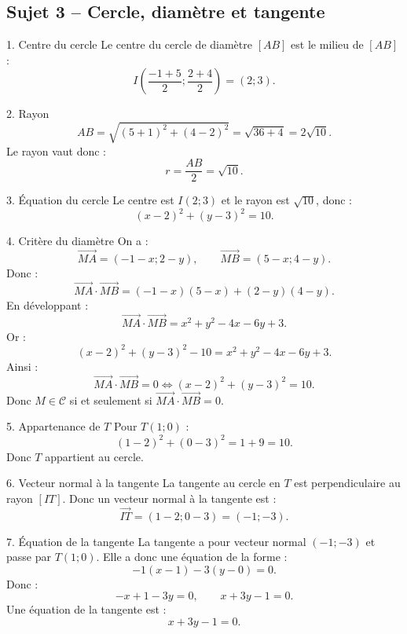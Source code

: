 \documentclass[11pt,a4paper]{article}
\begin{document}
\subsection*{Sujet 3 -- Cercle, diamètre et tangente}
\begin{correctionbox}{1. Centre du cercle}
Le centre du cercle de diamètre $[AB]$ est le milieu de $[AB]$ :
\[
I\left(\frac{-1+5}{2};\frac{2+4}{2}\right)=(2;3).
\]
\end{correctionbox}
\begin{correctionbox}{2. Rayon}
\[
AB=\sqrt{(5+1)^2+(4-2)^2}=\sqrt{36+4}=2\sqrt{10}.
\]
Le rayon vaut donc :
\[
r=\frac{AB}{2}=\sqrt{10}.
\]
\end{correctionbox}
\begin{correctionbox}{3. Équation du cercle}
Le centre est $I(2;3)$ et le rayon est $\sqrt{10}$, donc :
\[
(x-2)^2+(y-3)^2=10.
\]
\end{correctionbox}
\begin{correctionbox}{4. Critère du diamètre}
On a :
\[
\overrightarrow{MA}=(-1-x;2-y),\qquad
\overrightarrow{MB}=(5-x;4-y).
\]
Donc :
\[
\overrightarrow{MA}\cdot\overrightarrow{MB}=(-1-x)(5-x)+(2-y)(4-y).
\]
En développant :
\[
\overrightarrow{MA}\cdot\overrightarrow{MB}=x^2+y^2-4x-6y+3.
\]
Or :
\[
(x-2)^2+(y-3)^2-10=x^2+y^2-4x-6y+3.
\]
Ainsi :
\[
\overrightarrow{MA}\cdot\overrightarrow{MB}=0
\iff
(x-2)^2+(y-3)^2=10.
\]
Donc $M\in\mathcal C$ si et seulement si $\overrightarrow{MA}\cdot\overrightarrow{MB}=0$.
\end{correctionbox}
\begin{correctionbox}{5. Appartenance de $T$}
Pour $T(1;0)$ :
\[
(1-2)^2+(0-3)^2=1+9=10.
\]
Donc $T$ appartient au cercle.
\end{correctionbox}
\begin{correctionbox}{6. Vecteur normal à la tangente}
La tangente au cercle en $T$ est perpendiculaire au rayon $[IT]$. Donc un vecteur normal à la tangente est :
\[
\overrightarrow{IT}=(1-2;0-3)=(-1;-3).
\]
\end{correctionbox}
\begin{correctionbox}{7. Équation de la tangente}
La tangente a pour vecteur normal $(-1;-3)$ et passe par $T(1;0)$. Elle a donc une équation de la forme :
\[
-1(x-1)-3(y-0)=0.
\]
Donc :
\[
-x+1-3y=0,
\qquad x+3y-1=0.
\]
Une équation de la tangente est :
\[
x+3y-1=0.
\]
\end{correctionbox}
\end{document}
